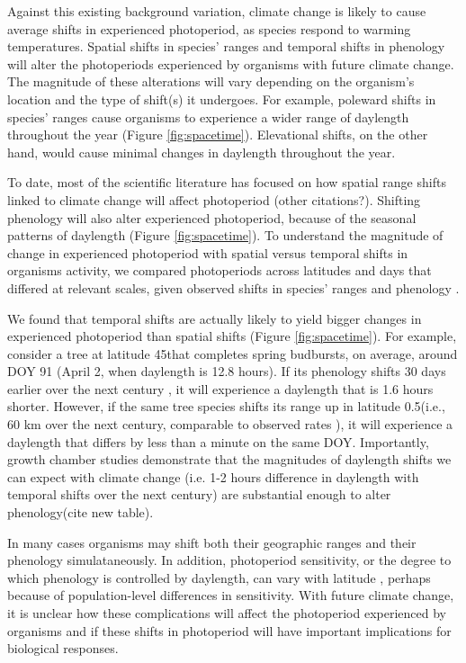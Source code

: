 \documentclass{article}
\begin{document}
\par Against this existing background variation, climate change is likely to cause average shifts in experienced photoperiod, as species respond to warming temperatures. Spatial shifts in species' ranges and temporal shifts in  phenology will alter the photoperiods experienced by organisms with future climate change. The magnitude of these alterations will vary depending on the organism's location and the type of shift(s) it undergoes. For example, poleward shifts in species' ranges cause organisms to experience a wider range of daylength throughout the year (Figure \ref{fig:spacetime}). Elevational shifts, on the other hand, would cause minimal changes in daylength throughout the year. 
\par To date, most of the scientific literature has focused on how spatial range shifts linked to climate change will affect photoperiod \citep{saikkonen2012} (other citations?). Shifting phenology will also alter experienced photoperiod, because of the seasonal patterns of daylength (Figure \ref{fig:spacetime}). To understand the magnitude of change in experienced photoperiod with spatial versus temporal shifts in organisms activity, we compared photoperiods across latitudes and days that differed at relevant scales, given observed shifts in  species' ranges and phenology \citep{parmesan2003,chen2011}.  
\par We found that temporal shifts are actually likely to yield bigger changes in experienced photoperiod than spatial shifts (Figure \ref{fig:spacetime}). For example, consider a tree at latitude 45\degree that completes spring budbursts, on average, around DOY 91 (April 2, when daylength is 12.8 hours). If its phenology shifts 30 days earlier over the next century \citep[][i.e., a rate of ~3 days per decade, as has been observed]{parmesan2003}, it will experience a daylength that is 1.6 hours shorter. However, if the same tree species shifts its range up in latitude 0.5\degree (i.e., 60 km over the next century,  comparable to observed rates \citep{parmesan2003, chen2011}), it will experience a daylength that differs by less than a minute on the same DOY. Importantly, growth chamber studies demonstrate that the magnitudes of daylength shifts we can expect with climate change (i.e. 1-2 hours difference in daylength with temporal shifts over the next century) are substantial enough to alter phenology(cite new table).  
\par In many cases organisms may shift both their geographic ranges and their phenology simulataneously. In addition, photoperiod sensitivity, or the degree to which phenology is controlled by daylength, can vary with latitude \citep{Howe:1996,saikkonen2012,Partanen:2005aa,Vihera-Aarnio:2006aa,Caffarra:2011b,gauzere2017}, perhaps because of population-level differences in sensitivity. With future climate change, it is unclear how these complications will affect the photoperiod experienced by organisms and if these shifts in photoperiod will have important implications for biological responses. 
\end{document}
